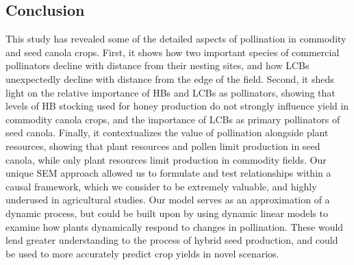 \documentclass[12pt]{article} %
\begin{document}
\subsection*{Conclusion} 

This study has revealed some of the detailed aspects of pollination in commodity and seed canola crops.
First, it shows how two important species of commercial pollinators decline with distance from their nesting sites, and how LCBs unexpectedly decline with distance from the edge of the field.
Second, it sheds light on the relative importance of HBs and LCBs as pollinators, showing that levels of HB stocking used for honey production do not strongly influence yield in commodity canola crops, and the importance of LCBs as primary pollinators of seed canola.
Finally, it contextualizes the value of pollination alongside plant resources, showing that plant resources and pollen limit production in seed canola, while only plant resources limit production in commodity fields.
Our unique SEM approach allowed us to formulate and test relationships within a causal framework, which we consider to be extremely valuable, and highly underused in agricultural studies.
Our model serves as an approximation of a dynamic process, but could be built upon by using dynamic linear models \citep{iwasa2000, nord2011, saez2018} to examine how plants dynamically respond to changes in pollination.
These would lend greater understanding to the process of hybrid seed production, and could be used to more accurately predict crop yields in novel scenarios.
\end{document}
